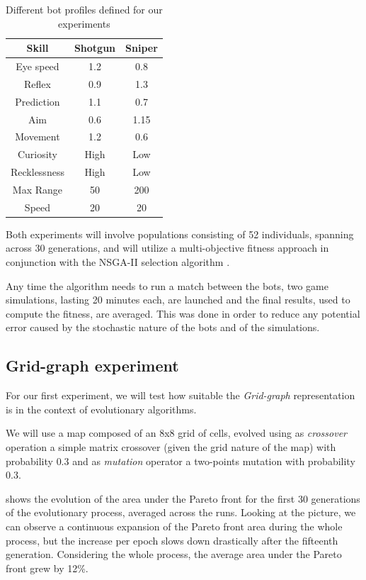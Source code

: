 \begin{table}
\begin{center}
\begin{tabular}{|| c || c | c ||}
 \hline
 Skill & Shotgun & Sniper \\ 
 \hline 
 Eye speed & 1.2 & 0.8 \\  
 Reflex & 0.9 & 1.3 \\   
 Prediction & 1.1 & 0.7 \\  
 Aim & 0.6 & 1.15 \\  
 Movement & 1.2 & 0.6 \\  
 Curiosity & High & Low \\  
 Recklessness & High & Low \\  
 Max Range & 50 & 200 \\  
 Speed & 20 & 20 \\  
 \hline
\end{tabular}
\caption{Different bot profiles defined for our experiments}
\label{table:parameters_first_experiment}
\end{center}
\end{table}

Both experiments will involve populations consisting of 52 individuals, spanning across 30 generations, and will utilize a multi-objective fitness approach in conjunction with the NSGA-II selection algorithm \cite{ngsaII}. 

Any time the algorithm needs to run a match between the bots, two game simulations, lasting 20 minutes each, are launched and the final results, used to compute the fitness, are averaged. This was done in order to reduce any potential error caused by the stochastic nature of the bots and of the simulations.

\subsection{Grid-graph experiment}
For our first experiment, we will test how suitable the \textit{Grid-graph} representation is in the context of evolutionary algorithms.

We will use a map composed of an 8x8 grid of cells, evolved using as \textit{crossover} operation a simple matrix crossover (given the grid nature of the map) with probability $0.3$ and as \textit{mutation} operator a two-points mutation with probability 0.3.

 shows the evolution of the area under the Pareto front for the first 30 generations of the evolutionary process, averaged across the runs.
Looking at the picture, we can observe a continuous expansion of the Pareto front area during the whole process, but the increase per epoch slows down drastically after the fifteenth generation. Considering the whole process, the average area under the Pareto front grew by 12\%.

